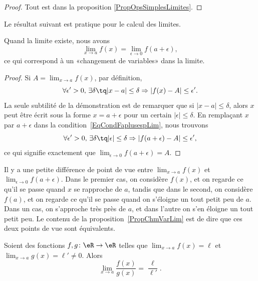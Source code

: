 \begin{proof}
	Tout est dans la proposition \ref{PropOpsSimplesLimites}.
\end{proof}


Le résultat suivant est pratique pour le calcul des limites.
\begin{proposition}     \label{PropChmVarLim}
	Quand la limite existe, nous avons
	\[
		\lim_{x\to a}f(x)=\lim_{\epsilon\to 0}f(a+\epsilon),
	\]
	ce qui correspond à un «changement de variables» dans la limite.
\end{proposition}

\begin{proof}
	Si \( A=\lim_{x\to a}f(x)\), par définition,
	\begin{equation}        \label{EqCondFaplusespLim}
		\forall\epsilon'>0,\,\exists\delta \tq | x-a |\leq\delta\Rightarrow| f(x)-A |\leq\epsilon'.
	\end{equation}
	La seule subtilité de la démonstration est de remarquer que si \( | x-a |\leq\delta\), alors \( x\) peut être écrit sous la forme \( x=a+\epsilon\) pour un certain \( | \epsilon |\leq\delta\). En remplaçant \( x\) par \( a+\epsilon\) dans la condition~\ref{EqCondFaplusespLim}, nous trouvons
	\begin{equation}
		\forall\epsilon'>0,\,\exists\delta \tq | \epsilon |\leq\delta\Rightarrow| f(a+\epsilon)-A |\leq\epsilon',
	\end{equation}
	ce qui signifie exactement que \( \lim_{\epsilon\to 0}f(a+\epsilon)=A\).
\end{proof}

Il y a une petite différence de point de vue entre \( \lim_{x\to a}f(x)\) et \( \lim_{\epsilon\to 0}f(a+\epsilon)\). Dans le premier cas, on considère \( f(x)\), et on regarde ce qu'il se passe quand \( x\) se rapproche de \( a\), tandis que dans le second, on considère \( f(a)\), et on regarde ce qu'il se passe quand on s'éloigne un tout petit peu de \( a\). Dans un cas, on s'approche très près de \( a\), et dans l'autre on s'en éloigne un tout petit peu. Le contenu de la proposition~\ref{PropChmVarLim} est de dire que ces deux points de vue sont équivalents.


\begin{proposition}      \label{PROPooOUPNooTrClHw}
	Soient des fonctions \( f,g\colon \eR\to \eR\) telles que \( \lim_{x\to a} f(x)=\ell\) et \( \lim_{x\to a} g(x)=\ell'\neq 0\). Alors
	\begin{equation}
		\lim_{x\to a} \frac{ f(x) }{ g(x) }=\frac{ \ell }{ \ell' }.
	\end{equation}
\end{proposition}

